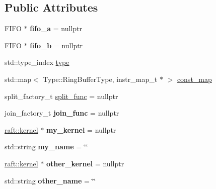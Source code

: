 \subsection*{Public Attributes}
\begin{DoxyCompactItemize}
\item 
\hypertarget{struct_port_info_af8148dcb4b8e6d355dbce4de10cc10cd}{}F\+I\+F\+O $\ast$ {\bfseries fifo\+\_\+a} = nullptr\label{struct_port_info_af8148dcb4b8e6d355dbce4de10cc10cd}

\item 
\hypertarget{struct_port_info_a071d6f3662fd14dc6b3d12913eecd4ad}{}F\+I\+F\+O $\ast$ {\bfseries fifo\+\_\+b} = nullptr\label{struct_port_info_a071d6f3662fd14dc6b3d12913eecd4ad}

\item 
std\+::type\+\_\+index \hyperlink{struct_port_info_a669818f0fde1da7b4a294c46e08d5980}{type}
\item 
std\+::map$<$ Type\+::\+Ring\+Buffer\+Type, instr\+\_\+map\+\_\+t $\ast$ $>$ \hyperlink{struct_port_info_a714592b5ab1fa47b599903639b102a66}{const\+\_\+map}
\item 
split\+\_\+factory\+\_\+t \hyperlink{struct_port_info_a6b7e8758b84288a4378233251252be77}{split\+\_\+func} = nullptr
\item 
\hypertarget{struct_port_info_a79c530d0df178e81f8ced267162463ba}{}join\+\_\+factory\+\_\+t {\bfseries join\+\_\+func} = nullptr\label{struct_port_info_a79c530d0df178e81f8ced267162463ba}

\item 
\hypertarget{struct_port_info_a52680ae480484d347333615eb2100633}{}\hyperlink{classraft_1_1kernel}{raft\+::kernel} $\ast$ {\bfseries my\+\_\+kernel} = nullptr\label{struct_port_info_a52680ae480484d347333615eb2100633}

\item 
\hypertarget{struct_port_info_a52b0d512d88e2a2ca9efc2e6d3195526}{}std\+::string {\bfseries my\+\_\+name} = \char`\"{}\char`\"{}\label{struct_port_info_a52b0d512d88e2a2ca9efc2e6d3195526}

\item 
\hypertarget{struct_port_info_a68948477f69bccb9a273a02eaae782d4}{}\hyperlink{classraft_1_1kernel}{raft\+::kernel} $\ast$ {\bfseries other\+\_\+kernel} = nullptr\label{struct_port_info_a68948477f69bccb9a273a02eaae782d4}

\item 
\hypertarget{struct_port_info_a5a51ce33a630378cea7ef141efd41b95}{}std\+::string {\bfseries other\+\_\+name} = \char`\"{}\char`\"{}\label{struct_port_info_a5a51ce33a630378cea7ef141efd41b95}


\end{DoxyCompactItemize}
